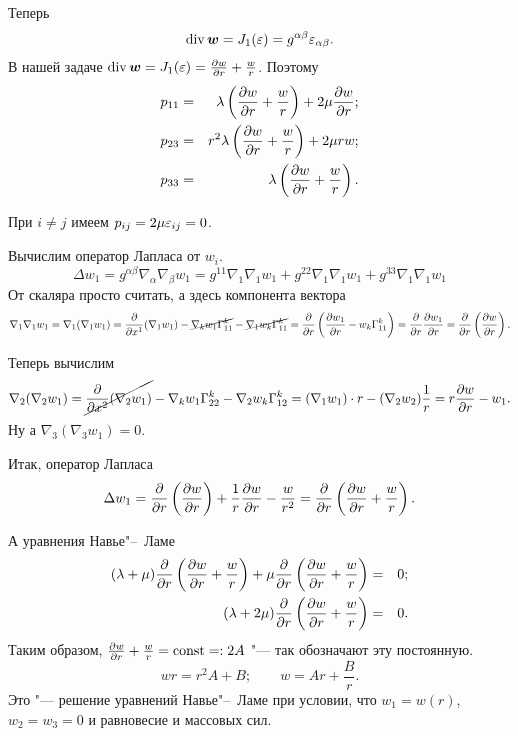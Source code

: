 Теперь
\[
  \operatorname{div}\boldsymbol{w} = J_1(\varepsilon) = g^{\alpha\beta}\varepsilon_{\alpha\beta}.
\]
В нашей задаче $\operatorname{div}\boldsymbol{w} = J_1(\varepsilon) = \frac{\partial w}{\partial r} + \frac wr$. Поэтому
\begin{eqnarray*}
  p_{11} &=&  \lambda\left( \frac{\partial w}{\partial r} + \frac wr \right) + 2\mu\frac{\partial w}{\partial r};\\
  p_{23} &=&  r^2\lambda\left( \frac{\partial w}{\partial r} + \frac wr \right) + 2\mu r w;\\
  p_{33} &=&  \lambda\left( \frac{\partial w}{\partial r} + \frac wr \right).
\end{eqnarray*}

При $i\ne j$ имеем $p_{ij} = 2\mu\varepsilon_{ij}=0$.

Вычислим оператор Лапласа от $w_i$.
\[
  \Delta w_1 = g^{\alpha\beta}\nabla_\alpha\nabla_\beta w_1 = 
g^{11}\nabla_1\nabla_1 w_1 +
g^{22}\nabla_1\nabla_1 w_1 +
g^{33}\nabla_1\nabla_1 w_1
\]
От скаляра просто считать, а здесь компонента вектора
\[
  \nabla_1\nabla_1 w_1 = \nabla_1(\nabla_1 w_1) = \frac{\partial  }{\partial x^1}(\nabla_1 w_1) - 
  \cancel{\nabla_k w_1\Gamma^k_{11}} - 
  \cancel{\nabla_1 w_k\Gamma^k_{11}} = 
  \frac{\partial  }{\partial r}\left( \frac{\partial w_1}{\partial r} - w_k\Gamma_{11}^k \right) = \frac{\partial  }{\partial r}\frac{\partial w_1}{\partial r} = \frac{\partial  }{\partial r}\left( \frac{\partial w}{\partial r} \right).
\]

Теперь вычислим
\[
  \nabla_2(\nabla_2 w_1) = 
  \cancel{\frac{\partial  }{\partial x^2}(\nabla_2 w_1)} - 
  \nabla_k w_1\Gamma_{22}^k - 
  \nabla_2 w_k\Gamma_{12}^k = 
  (\nabla_1 w_1)\cdot r 
  - (\nabla_2 w_2)\frac1r = 
  r\frac{\partial w}{\partial r} - w_1.
\]
Ну а $\nabla_3(\nabla_3 w_1) = 0$.

Итак, оператор Лапласа
\[
  \Delta w_1 = \frac{\partial  }{\partial r}\left( \frac{\partial w}{\partial r} \right) +\frac1r\frac{\partial w}{\partial r} - \frac w{r^2} = 
  \frac{\partial  }{\partial r}\left( \frac{\partial w}{\partial r} + \frac wr \right).
\]

А уравнения Навье"--~Ламе
\begin{eqnarray*}
  (\lambda+\mu)\frac{\partial  }{\partial r}\left( \frac{\partial w}{\partial r} + \frac wr \right) + \mu\frac{\partial }{\partial r}\left( \frac{\partial w}{\partial r} + \frac wr \right)&=& 0;\\
  (\lambda+2\mu)\frac{\partial  }{\partial r}\left( \frac{\partial w}{\partial r} + \frac wr \right)&=& 0.
\end{eqnarray*}
Таким образом, $\frac{\partial w}{\partial r} + \frac wr = \operatorname{const} =: 2A$ "--- так обозначают эту постоянную.
\[
  wr = r^2 A + B;\qquad w = Ar + \frac Br.
\]
Это "--- решение уравнений Навье"--~Ламе при условии, что $w_1 = w(r)$, $w_2=w_3=0$ и равновесие и массовых сил.
